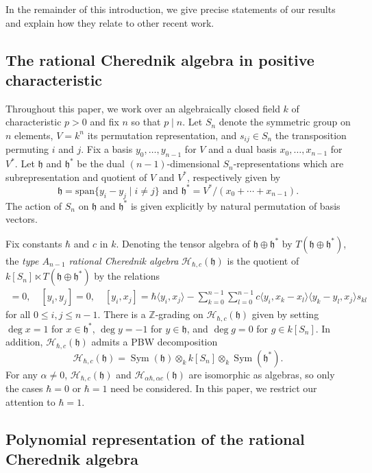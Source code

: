 \documentclass{amsart}
\numberwithin{equation}{section}
\theoremstyle{definition}
\newcommand{\ZZ}{\mathbb{Z}}
\newcommand{\h}{\mathfrak{h}}
\newcommand{\HH}{\mathcal{H}}
\newcommand{\Sym}{\operatorname{Sym}}
\newcommand{\sspan}{\text{span}}
\begin{document}
In the remainder of this introduction, we give precise statements of our results and explain how they relate to other recent work.

\subsection{The rational Cherednik algebra in positive characteristic}

Throughout this paper, we work over an algebraically closed field $k$ of characteristic $p > 0$ and fix $n$ so that $p \mid n$.  Let $S_n$ denote the symmetric group on $n$ elements, $V = k^n$ its permutation representation, and $s_{ij} \in S_n$ the transposition permuting $i$ and $j$.  Fix a basis $y_0,\ldots,y_{n-1}$ for $V$ and a dual basis $x_0, \ldots, x_{n-1}$ for $V^*$.  Let $\h$ and $\h^*$ be the dual $(n - 1)$-dimensional $S_n$-representations which are subrepresentation and quotient of $V$ and $V^*$, respectively given by
\[
\h = \sspan\{y_i - y_j \mid i \neq j\} \text{ and } \h^* = V^*/(x_0 + \cdots + x_{n - 1}).
\]
The action of $S_n$ on $\h$ and $\h^*$ is given explicitly by natural permutation of basis vectors.

Fix constants $\hbar$ and $c$ in $k$.  Denoting the tensor algebra of $\h \oplus \h^*$ by $T(\h \oplus \h^*)$, the \textit{type $A_{n - 1}$ rational Cherednik algebra} $\HH_{\hbar, c}(\h)$ is the quotient of $k[S_n] \ltimes T(\h \oplus \h^*)$ by the relations
\begin{align*}
[x_i,x_j]=0, \quad [y_i,y_j] = 0, \quad [y_i,x_j] = \hbar\langle y_i,x_j\rangle - \sum_{k=0}^{n-1}\sum_{l=0}^{n-1} c\langle y_i,x_k-x_l \rangle\langle y_k-y_l,x_j\rangle s_{kl}
\end{align*}
for all $0 \le i,j \le n-1$.  There is a $\ZZ$-grading on $\HH_{\hbar,c}(\h)$ given by setting $\deg x=1$ for $x \in \h^*$, $\deg y = -1$ for $y \in \h$, and $\deg g=0$ for $g \in k[S_n]$.  In addition, $\HH_{\hbar, c}(\h)$ admits a PBW decomposition 
\[
\HH_{\hbar,c}(\h) = \Sym(\h) \otimes_k k[S_n] \otimes_k \Sym(\h^*).
\]
For any $\alpha \ne 0$, $\HH_{\hbar,c}(\h)$ and $\HH_{\alpha\hbar,\alpha c}(\h)$ are isomorphic as algebras, so only the cases $\hbar = 0$ or $\hbar = 1$ need be considered.  In this paper, we restrict our attention to $\hbar = 1$.

\subsection{Polynomial representation of the rational Cherednik algebra}
\end{document}

